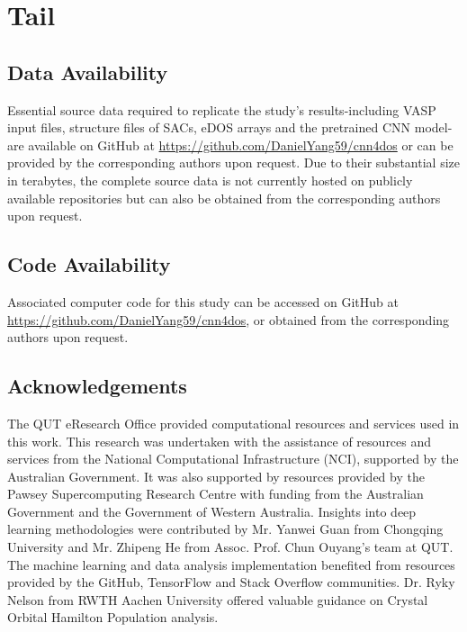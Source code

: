 

\section{Tail}

\subsection{Data Availability}
Essential source data required to replicate the study's results-including VASP input files,
structure files of SACs, eDOS arrays and the pretrained CNN model-are available on GitHub
at \url{https://github.com/DanielYang59/cnn4dos} or can be provided by the corresponding authors upon request.
Due to their substantial size in terabytes, the complete source data is not currently hosted on publicly available repositories but can also be obtained from the corresponding authors upon request.


\subsection{Code Availability}
Associated computer code for this study can be accessed on GitHub at \url{https://github.com/DanielYang59/cnn4dos},
or obtained from the corresponding authors upon request.


 \subsection{Acknowledgements}
The QUT eResearch Office provided computational resources and services used in this work.
This research was undertaken with the assistance of resources and services from the National Computational Infrastructure (NCI), supported by the Australian Government.
It was also supported by resources provided by the Pawsey Supercomputing Research Centre with funding from the Australian Government and the Government of Western Australia.
Insights into deep learning methodologies were contributed by Mr. Yanwei Guan from Chongqing University and Mr. Zhipeng He from Assoc. Prof. Chun Ouyang's team at QUT.
The machine learning and data analysis implementation benefited from resources provided by the GitHub, TensorFlow and Stack Overflow communities.
Dr. Ryky Nelson from RWTH Aachen University offered valuable guidance on Crystal Orbital Hamilton Population analysis.


